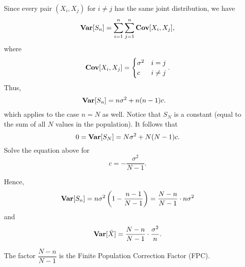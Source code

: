 \documentclass[UTF8,a4paper,10pt]{article}
\begin{document}
Since every pair $(X_i, X_j)$ for $i \neq j$ has the same joint distribution, we have
\begin{align*}
    \operatorname{\textbf{Var}}[S_n] = \sum_{i=1}^{n}\sum_{j=1}^{n}\operatorname{\textbf{Cov}}[X_i,X_j],
\end{align*}
where 
\[\operatorname{\textbf{Cov}}[X_i,X_j] = \begin{cases}
     \sigma^2 & i=j\\
    c  & i\neq j\\
\end{cases}.\]
Thus,
\begin{align*}
    \operatorname{\textbf{Var}}[S_n] 
    &= n\sigma^2 + n(n-1)c.\label{eq.01}
\end{align*}
which applies to the case $n=N$ as well. Notice that $S_N$ is a constant (equal to the sum of all $N$ values in the population). It follows that
\[
0 = \operatorname{\textbf{Var}}[S_N] = N\sigma^2 + N(N-1)c.
\]
Solve the equation above for $$c = -\frac{\sigma^2}{N-1}.$$

Hence,
\[
\operatorname{\textbf{Var}}[S_n] = n\sigma^2\left(1 - \frac{n-1}{N-1}\right) = \frac{N-n}{N-1} \cdot n\sigma^2
\]
and
\[
\operatorname{\textbf{Var}}[\bar{X}] = \frac{N-n}{N-1} \cdot \frac{\sigma^2}{n}.
\]

The factor \(\dfrac{N-n}{N-1}\) is the Finite Population Correction Factor (FPC).

\pagebreak
\end{document}
